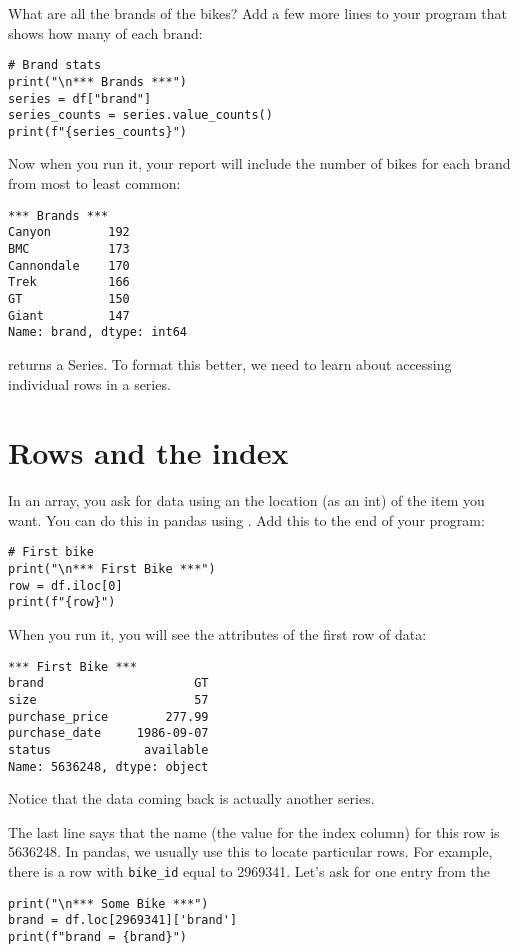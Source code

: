 What are all the brands of the bikes? Add a few more lines to your
program that shows how many of each brand:

\begin{Verbatim}
# Brand stats
print("\n*** Brands ***")
series = df["brand"]
series_counts = series.value_counts()
print(f"{series_counts}")
\end{Verbatim}

Now when you run it, your report will include the number of bikes for
each brand from most to least common:

\begin{Verbatim}
*** Brands ***
Canyon        192
BMC           173
Cannondale    170
Trek          166
GT            150
Giant         147
Name: brand, dtype: int64
\end{Verbatim}

 returns a Series.  To format this better, we
need to learn about accessing individual rows in a series.

\section{Rows and the index}

In an array, you ask for data using an the location (as an int) of the
item you want. You can do this in pandas using . Add
this to the end of your program:

\begin{Verbatim}
# First bike
print("\n*** First Bike ***")
row = df.iloc[0]
print(f"{row}")
\end{Verbatim}

When you run it, you will see the attributes of the first row of data:

\begin{Verbatim}
*** First Bike ***
brand                     GT
size                      57
purchase_price        277.99
purchase_date     1986-09-07
status             available
Name: 5636248, dtype: object
\end{Verbatim}

Notice that the data coming back is actually another series.

The last line says that the name (the value for the index column) for
this row is 5636248.  In pandas, we usually use this to locate
particular rows.  For example, there is a row with \texttt{bike\_id}
equal to 2969341. Let's ask for one entry from the 

\begin{Verbatim}
print("\n*** Some Bike ***")
brand = df.loc[2969341]['brand']
print(f"brand = {brand}")
\end{Verbatim}

